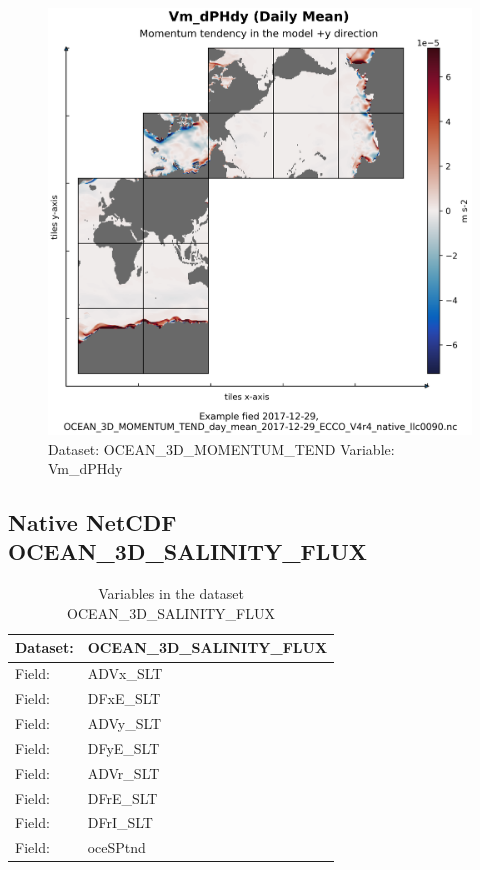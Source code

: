 \begin{figure}[H]
\centering
\includegraphics[width=\textwidth]{../images/plots/native_plots/Ocean_Three-Dimensional_Momentum_Tendency/Vm_dPHdy.png}
\caption{Dataset: OCEAN\_3D\_MOMENTUM\_TEND Variable: Vm\_dPHdy}
\label{tab:table-OCEAN_3D_MOMENTUM_TEND_Vm_dPHdy-Plot}
\end{figure}
\pagebreak
\subsection{Native NetCDF OCEAN\_3D\_SALINITY\_FLUX}
\newp
\begin{longtable}{|p{}|p{}|}
\caption{Variables in the dataset OCEAN\_3D\_SALINITY\_FLUX}
\label{tab:table-OCEAN_3D_SALINITY_FLUX-fields} \\ 
\hline \endhead \hline \endfoot
\rowcolor{lightgray} \textbf{Dataset:} & \textbf{OCEAN\_3D\_SALINITY\_FLUX} \\ \hline
Field: &ADVx\_SLT \\ \hline
Field: &DFxE\_SLT \\ \hline
Field: &ADVy\_SLT \\ \hline
Field: &DFyE\_SLT \\ \hline
Field: &ADVr\_SLT \\ \hline
Field: &DFrE\_SLT \\ \hline
Field: &DFrI\_SLT \\ \hline
Field: &oceSPtnd \\ \hline
\end{longtable}


